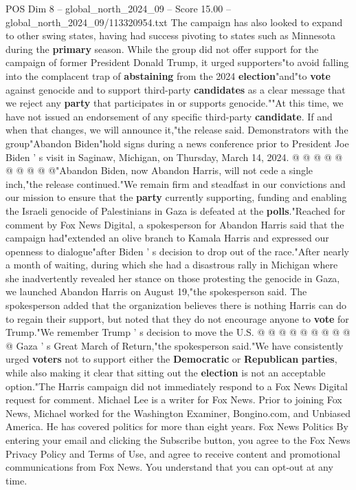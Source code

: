 \begin{textsample}{POS Dim 8 – global\_north\_2024\_09 – Score 15.00 – global\_north\_2024\_09/113320954.txt}
The campaign has also looked to expand to other swing states, having had success pivoting to states such as Minnesota during the \textbf{primary} season.
While the group did not offer support for the campaign of former President Donald Trump, it urged supporters"to avoid falling into the complacent trap of \textbf{abstaining} from the 2024 \textbf{election}"and"to \textbf{vote} against genocide and to support third-party \textbf{candidates} as a clear message that we reject any \textbf{party} that participates in or supports genocide.""At this time, we have not issued an endorsement of any specific third-party \textbf{candidate}.
If and when that changes, we will announce it,"the release said.
Demonstrators with the group"Abandon Biden"hold signs during a news conference prior to President Joe Biden ' s visit in Saginaw, Michigan, on Thursday, March 14, 2024. @ @ @ @ @ @ @ @ @ @"Abandon Biden, now Abandon Harris, will not cede a single inch,"the release continued."We remain firm and steadfast in our convictions and our mission to ensure that the \textbf{party} currently supporting, funding and enabling the Israeli genocide of Palestinians in Gaza is defeated at the \textbf{polls}."Reached for comment by Fox News Digital, a spokesperson for Abandon Harris said that the campaign had"extended an olive branch to Kamala Harris and expressed our openness to dialogue"after Biden ' s decision to drop out of the race."After nearly a month of waiting, during which she had a disastrous rally in Michigan where she inadvertently revealed her stance on those protesting the genocide in Gaza, we launched Abandon Harris on August 19,"the spokesperson said.
The spokesperson added that the organization believes there is nothing Harris can do to regain their support, but noted that they do not encourage anyone to \textbf{vote} for Trump."We remember Trump ' s decision to move the U.S. @ @ @ @ @ @ @ @ @ @ Gaza ' s Great March of Return,"the spokesperson said."We have consistently urged \textbf{voters} not to support either the \textbf{Democratic} or \textbf{Republican} \textbf{parties}, while also making it clear that sitting out the \textbf{election} is not an acceptable option."The Harris campaign did not immediately respond to a Fox News Digital request for comment.
Michael Lee is a writer for Fox News.
Prior to joining Fox News, Michael worked for the Washington Examiner, Bongino.com, and Unbiased America.
He has covered politics for more than eight years.
Fox News Politics By entering your email and clicking the Subscribe button, you agree to the Fox News Privacy Policy and Terms of Use, and agree to receive content and promotional communications from Fox News.
You understand that you can opt-out at any time.

\end{textsample}
